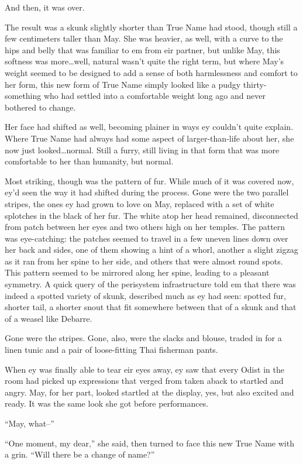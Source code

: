 And then, it was over.

The result was a skunk slightly shorter than True Name had stood, though still a few centimeters taller than May. She was heavier, as well, with a curve to the hips and belly that was familiar to em from eir partner, but unlike May, this softness was more\ldots well, natural wasn't quite the right term, but where May's weight seemed to be designed to add a sense of both harmlessness and comfort to her form, this new form of True Name simply looked like a pudgy thirty-something who had settled into a comfortable weight long ago and never bothered to change.

Her face had shifted as well, becoming plainer in ways ey couldn't quite explain. Where True Name had always had some aspect of larger-than-life about her, she now just looked\ldots normal. Still a furry, still living in that form that was more comfortable to her than humanity, but normal.

Most striking, though was the pattern of fur. While much of it was covered now, ey'd seen the way it had shifted during the process. Gone were the two parallel stripes, the ones ey had grown to love on May, replaced with a set of white splotches in the black of her fur. The white atop her head remained, disconnected from patch between her eyes and two others high on her temples. The pattern was eye-catching: the patches seemed to travel in a few uneven lines down over her back and sides, one of them showing a hint of a whorl, another a slight zigzag as it ran from her spine to her side, and others that were almost round spots. This pattern seemed to be mirrored along her spine, leading to a pleasant symmetry. A quick query of the perisystem infrastructure told em that there was indeed a spotted variety of skunk, described much as ey had seen: spotted fur, shorter tail, a shorter snout that fit somewhere between that of a skunk and that of a weasel like Debarre.

Gone were the stripes. Gone, also, were the slacks and blouse, traded in for a linen tunic and a pair of loose-fitting Thai fisherman pants.

When ey was finally able to tear eir eyes away, ey saw that every Odist in the room had picked up expressions that verged from taken aback to startled and angry. May, for her part, looked startled at the display, yes, but also excited and ready. It was the same look she got before performances.

``May, what--''

``One moment, my dear,'' she said, then turned to face this new True Name with a grin. ``Will there be a change of name?''


